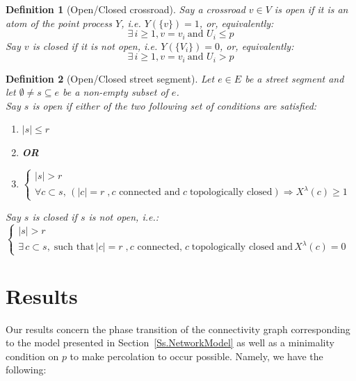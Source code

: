 \documentclass[10pt,a4paper]{amsart}
\theoremstyle{exampstyle}
\newtheorem{Definition}{Definition}
\theoremstyle{exampnotations}
\begin{document}
\begin{Definition}[Open/Closed crossroad]
\label{Def.open/crossroad}
Say a crossroad $v \in V$ is \emph{open} if it is an atom of the point process $Y$, i.e. $Y(\lbrace v\rbrace) = 1$, or, equivalently:
\begin{equation*}
   \exists \,  i \geq 1, v=v_i \: \text{and } U_i \leq p
\end{equation*}
Say $v$ is \emph{closed} if it is not open, i.e. $Y(\lbrace V_i \rbrace) = 0$, or, equivalently:
\begin{equation*}
   \exists \,  i \geq 1, v=v_i \: \text{and } U_i > p
\end{equation*}
\end{Definition}

\begin{Definition}[Open/Closed street segment]
\label{Def.open/closed/subcritical}
Let $e \in E$ be a street segment and let $\emptyset \neq s \subseteq e$ be a non-empty subset of $e$.\\ Say $s$ is \emph{open} if either of the two following set of conditions are satisfied:
\begin{enumerate}
\item $\vert s \vert \leq r$
\vspace{.2 cm}
\item[]\textbf{OR}
\vspace{.2 cm}
\item $\left\{
\begin{array}{l}
\vert s \vert > r \\
\forall c \subset s, \, (\vert c \vert = r \; , c \text{ connected and} \; c  \; \text{topologically closed} )\Rightarrow X^{\lambda}(c) \geq 1
\end{array}
\right.$
\end{enumerate}
Say $s$ is \emph{closed} if $s$ is not open, i.e.: \\
 $\left\{
\begin{array}{l}
\vert s \vert > r \\
\exists \, c \subset s, \; \text{such that} \, \vert c \vert = r \; ,c \text{ connected,} \; c  \; \text{topologically closed} \; \text{and} \,  X^{\lambda}(c) = 0
\end{array}
\right.$
\end{Definition}

\section{Results}
\label{S.Results}
Our results concern the phase transition of the connectivity graph corresponding to the model presented in Section~\ref{Ss.NetworkModel} as well as a minimality condition on $p$ to make percolation to occur possible. Namely, we have the following:
\end{document}
